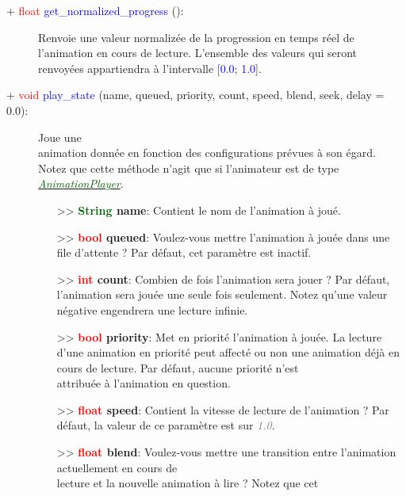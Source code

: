 \documentclass[a4paper, 11pt]{article}
\begin{document}
	\newpage \begin{description}
		\item [+ \textcolor{red}{float} \textcolor{blue}{get\_normalized\_progress} 
		():] Renvoie une valeur normalizée de la progression en temps réel de l'animation en cours de 
		lecture. L'ensemble des valeurs qui seront renvoyées appartiendra à l'intervalle [\textcolor{blue}
		{0.0}; \textcolor{blue}{1.0}].\\
	\end{description}
	\begin{description}
		\item [+ \textcolor{red}{void} \textcolor{blue}{play\_state} (name, queued, priority, count, speed, 
		blend, seek, delay = 0.0):] Joue une \\animation donnée en fonction des configurations prévues à son 
		égard. Notez que cette méthode n'agit que si l'animateur est de type
		\href{https://docs.godotengine.org/fr/stable/classes/class_animationplayer.html}
		{\textit{\textcolor{darkgreen}{AnimationPlayer}}}.
		\begin{itemize}
			\item [>> \textbf{\textcolor{darkgreen}{String} name}:] Contient le nom de l'animation à joué.
			\item [>> \textbf{\textcolor{red}{bool} queued}:] Voulez-vous mettre l'animation à jouée dans 
			une file d'attente ? Par défaut, cet paramètre est inactif.
			\item [>> \textbf{\textcolor{red}{int} count}:] Combien de fois l'animation sera jouer ? Par 
			défaut, l'animation sera jouée une seule fois seulement. Notez qu'une valeur négative engendrera
			une lecture infinie.
			\item [>> \textbf{\textcolor{red}{bool} priority}:] Met en priorité l'animation à jouée. La
			lecture d'une animation en priorité peut affecté ou non une animation déjà en cours de lecture.
			Par défaut, aucune priorité n'est \\attribuée à l'animation en question.
			\item [>> \textbf{\textcolor{red}{float} speed}:] Contient la vitesse de lecture de l'animation 
			? Par défaut, la valeur de ce paramètre est sur \textcolor{gray}{\textit{1.0}}.
			\item [>> \textbf{\textcolor{red}{float} blend}:] Voulez-vous mettre une transition entre 
			l'animation actuellement en cours de \\lecture et la nouvelle animation à lire ? Notez que cet 

\end{itemize}
\end{description}
\end{document}
